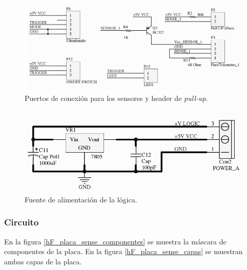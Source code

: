 \begin{figure}
	\centering
	\includegraphics[scale=.28]{figuras/sense_schemaSensor.png}
	\caption{Puertos de conexi\'on para los sensores y header de \emph{pull-up}.}
	\label{hF_placa_sense_schema3}
\end{figure}

\begin{figure}
	\centering
	\includegraphics[scale=.22]{figuras/sense_schemaFuente.png}
	\caption{Fuente de alimentaci\'on de la l\'ogica.}
	\label{hF_placa_sense_schema4}
\end{figure}

\subsubsection{Circuito}
\label{h_placas_sensado_circuito}

En la figura \ref{hF_placa_sense_componentes} se muestra la m\'ascara de componentes de la placa.
En la figura \ref{hF_placa_sense_capas} se muestran ambas capas de la placa.

